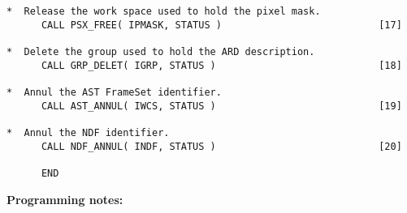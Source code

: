 \begin{verbatim}
*  Release the work space used to hold the pixel mask.        
      CALL PSX_FREE( IPMASK, STATUS )                           [17]
                                                              
*  Delete the group used to hold the ARD description.         
      CALL GRP_DELET( IGRP, STATUS )                            [18]
                                                              
*  Annul the AST FrameSet identifier.                                  
      CALL AST_ANNUL( IWCS, STATUS )                            [19]
                                                              
*  Annul the NDF identifier.                                  
      CALL NDF_ANNUL( INDF, STATUS )                            [20]
                                                              
      END                                                     
\end{verbatim}
\normalsize

{\bf Programming notes:}

